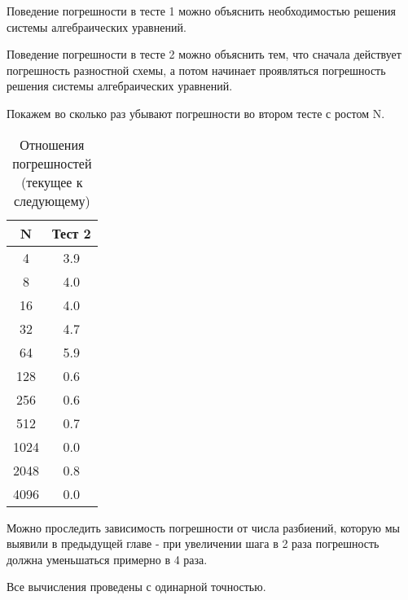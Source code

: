 Поведение погрешности в тесте 1 можно объяснить необходимостью решения системы алгебраических уравнений.

Поведение погрешности в тесте 2 можно объяснить тем, что сначала действует погрешность разностной схемы, а потом начинает проявляться погрешность решения системы алгебраических уравнений.

Покажем во сколько раз убывают погрешности во втором тесте с ростом N.

  \begin{table}[H]
    \centering
    \begin{tabular}{c | c}
      \toprule
      N & Тест 2 \\
      \midrule
4 & 3.9 \\
8 & 4.0 \\
16 & 4.0 \\
32 & 4.7 \\
64 & 5.9 \\
128 & 0.6 \\
256 & 0.6 \\
512 & 0.7 \\
1024 & 0.0 \\
2048 & 0.8 \\
4096 & 0.0 \\

      \bottomrule
    \end{tabular}
    \caption{Отношения погрешностей (текущее к следующему)}
  \end{table}

Можно проследить зависимость погрешности от числа разбиений, которую мы выявили в предыдущей главе - при увеличении шага в 2 раза погрешность должна уменьшаться примерно в 4 раза.

Все вычисления проведены с одинарной точностью.
